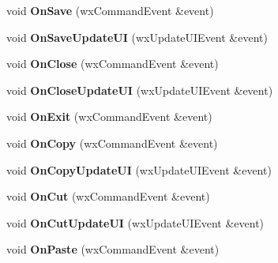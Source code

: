 \begin{DoxyCompactItemize}
\item 
\hypertarget{class_main_frame_a78af6a47c864028ec8855cdd3f08c027}{void {\bfseries On\-Save} (wx\-Command\-Event \&event)}\label{class_main_frame_a78af6a47c864028ec8855cdd3f08c027}

\item 
\hypertarget{class_main_frame_a5160647848d288c9e750807f6237158a}{void {\bfseries On\-Save\-Update\-U\-I} (wx\-Update\-U\-I\-Event \&event)}\label{class_main_frame_a5160647848d288c9e750807f6237158a}

\item 
\hypertarget{class_main_frame_a22a222bc2e78f162e63113282fe7b008}{void {\bfseries On\-Close} (wx\-Command\-Event \&event)}\label{class_main_frame_a22a222bc2e78f162e63113282fe7b008}

\item 
\hypertarget{class_main_frame_aa5c50eabdeda94f98d2a820022dc5c7d}{void {\bfseries On\-Close\-Update\-U\-I} (wx\-Update\-U\-I\-Event \&event)}\label{class_main_frame_aa5c50eabdeda94f98d2a820022dc5c7d}

\item 
\hypertarget{class_main_frame_af1146ec5200a7421957b143782bca765}{void {\bfseries On\-Exit} (wx\-Command\-Event \&event)}\label{class_main_frame_af1146ec5200a7421957b143782bca765}

\item 
\hypertarget{class_main_frame_a8097107697fc7fa693ab55aa7ea71a8b}{void {\bfseries On\-Copy} (wx\-Command\-Event \&event)}\label{class_main_frame_a8097107697fc7fa693ab55aa7ea71a8b}

\item 
\hypertarget{class_main_frame_a1359735d6cce965dfcaa161cee9e8df8}{void {\bfseries On\-Copy\-Update\-U\-I} (wx\-Update\-U\-I\-Event \&event)}\label{class_main_frame_a1359735d6cce965dfcaa161cee9e8df8}

\item 
\hypertarget{class_main_frame_aeb57051751eb8390a8305766620ca253}{void {\bfseries On\-Cut} (wx\-Command\-Event \&event)}\label{class_main_frame_aeb57051751eb8390a8305766620ca253}

\item 
\hypertarget{class_main_frame_ae9222bb34fe54e65f32e9dcde9315d2d}{void {\bfseries On\-Cut\-Update\-U\-I} (wx\-Update\-U\-I\-Event \&event)}\label{class_main_frame_ae9222bb34fe54e65f32e9dcde9315d2d}

\item 
\hypertarget{class_main_frame_af6e53b7f644155f5235a8dfc940ea885}{void {\bfseries On\-Paste} (wx\-Command\-Event \&event)}\label{class_main_frame_af6e53b7f644155f5235a8dfc940ea885}


\end{DoxyCompactItemize}
